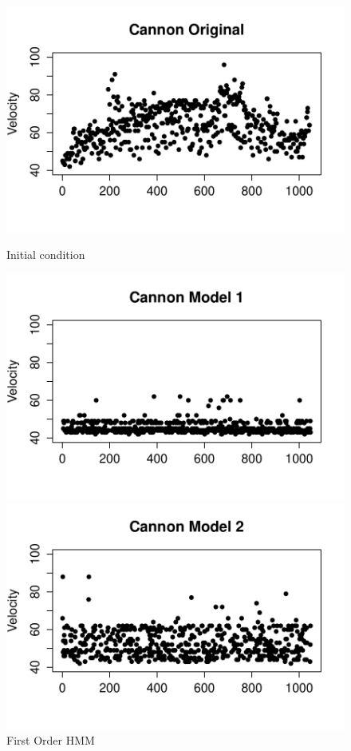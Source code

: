 \documentclass{article} %
\begin{document}
\begin{figure}[ht] 
  \label{ fig7} 
  \begin{minipage}[b]{0.5\linewidth}
    \centering
    \includegraphics[scale = 0.45]{CannonOriginalVelocity.pdf} 
    \caption{Initial condition} 
    \vspace{4ex}
  \end{minipage}%
  \begin{minipage}[b]{0.5\linewidth}
    \centering
    \includegraphics[scale = 0.45]{CannonModel1Velocity.pdf} 
    \caption{First Order HMM} 
    \vspace{4ex}
  \end{minipage} 
  \begin{minipage}[b]{0.5\linewidth}
    \centering
    \includegraphics[scale = 0.45]{CannonModel2Velocity.pdf} 

\end{minipage}
\end{figure}
\end{document}
